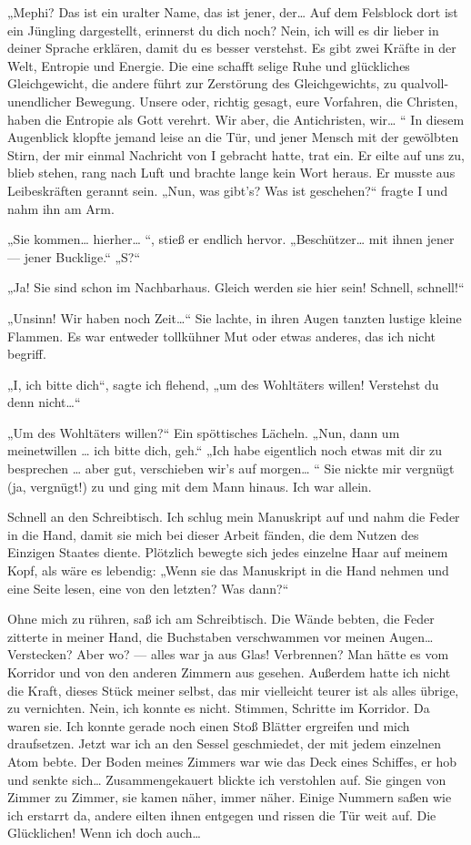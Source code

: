„Mephi? Das ist ein uralter Name, das ist jener, der\ldots{} Auf dem
Felsblock dort ist ein Jüngling dargestellt, erinnerst du dich
noch? Nein, ich will es dir lieber in deiner Sprache erklären,
damit du es besser verstehst. Es gibt zwei Kräfte in der Welt,
Entropie und Energie. Die eine schafft selige Ruhe und glückliches
Gleichgewicht, die andere führt zur Zerstörung des Gleichgewichts,
zu qualvoll-unendlicher Bewegung. Unsere oder, richtig gesagt, eure
Vorfahren, die Christen, haben die Entropie als Gott verehrt. Wir
aber, die Antichristen, wir\ldots{} “ In diesem Augenblick klopfte
jemand leise an die Tür, und jener Mensch mit der gewölbten Stirn,
der mir einmal Nachricht von I gebracht hatte, trat ein. Er eilte
auf uns zu, blieb stehen, rang nach Luft und brachte lange kein
Wort heraus. Er musste aus Leibeskräften gerannt sein. „Nun, was
gibt's? Was ist geschehen?“ fragte I und nahm ihn am Arm.

„Sie kommen\ldots{} hierher\ldots{} “, stieß er endlich hervor.
„Beschützer\ldots{} mit ihnen jener — jener Bucklige.“ „S?“

„Ja! Sie sind schon im Nachbarhaus. Gleich werden sie hier sein!
Schnell, schnell!“

„Unsinn! Wir haben noch Zeit\ldots{}“ Sie lachte, in ihren Augen tanzten
lustige kleine Flammen. Es war entweder tollkühner Mut oder etwas
anderes, das ich nicht begriff.

„I, ich bitte dich“, sagte ich flehend, „um des Wohltäters willen!
Verstehst du denn nicht\ldots{}“

„Um des Wohltäters willen?“ Ein spöttisches Lächeln. „Nun, dann um
meinetwillen \ldots{} ich bitte dich, geh.“ „Ich habe eigentlich noch
etwas mit dir zu besprechen \ldots{} aber gut, verschieben wir's auf
morgen\ldots{} “ Sie nickte mir vergnügt (ja, vergnügt!) zu und ging mit
dem Mann hinaus. Ich war allein.

Schnell an den Schreibtisch. Ich schlug mein Manuskript auf und
nahm die Feder in die Hand, damit sie mich bei dieser Arbeit
fänden, die dem Nutzen des Einzigen Staates diente. Plötzlich
bewegte sich jedes einzelne Haar auf meinem Kopf, als wäre es
lebendig: „Wenn sie das Manuskript in die Hand nehmen und eine
Seite lesen, eine von den letzten? Was dann?“

Ohne mich zu rühren, saß ich am Schreibtisch. Die Wände bebten, die
Feder zitterte in meiner Hand, die Buchstaben verschwammen vor
meinen Augen\ldots{} Verstecken? Aber wo? — alles war ja aus Glas!
Verbrennen? Man hätte es vom Korridor und von den anderen Zimmern
aus gesehen. Außerdem hatte ich nicht die Kraft, dieses Stück
meiner selbst, das mir vielleicht teurer ist als alles übrige, zu
vernichten. Nein, ich konnte es nicht. Stimmen, Schritte im
Korridor. Da waren sie. Ich konnte gerade noch einen Stoß Blätter
ergreifen und mich draufsetzen. Jetzt war ich an den Sessel
geschmiedet, der mit jedem einzelnen Atom bebte. Der Boden meines
Zimmers war wie das Deck eines Schiffes, er hob und senkte sich\ldots{}
Zusammengekauert blickte ich verstohlen auf. Sie gingen von Zimmer
zu Zimmer, sie kamen näher, immer näher. Einige Nummern saßen wie
ich erstarrt da, andere eilten ihnen entgegen und rissen die Tür
weit auf. Die Glücklichen! Wenn ich doch auch\ldots{}

